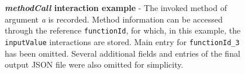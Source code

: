 \begin{figure}[tp]
	\centering
	\begin{lrbox}{\mintedbox}
		\begin{minipage}{0.4\textwidth}
		\end{minipage}
	\end{lrbox}
	\hfill
	\begin{lrbox}{\mintedbox}
		\begin{minipage}{0.58\textwidth}
		\end{minipage}
	\end{lrbox}
	\caption[\textit{methodCall} interaction example]{\textbf{\textit{methodCall} interaction example} - The invoked method of argument \textit{a} is recorded. Method information can be accessed through the reference \texttt{functionId}, for which, in this example, the \texttt{inputValue} interactions are stored. Main entry for \texttt{functionId_3} has been omitted. Several additional fields and entries of the final output JSON file were also omitted for simplicity.}
	\label{fig:run-time-information-gathering-method-call}
\end{figure}